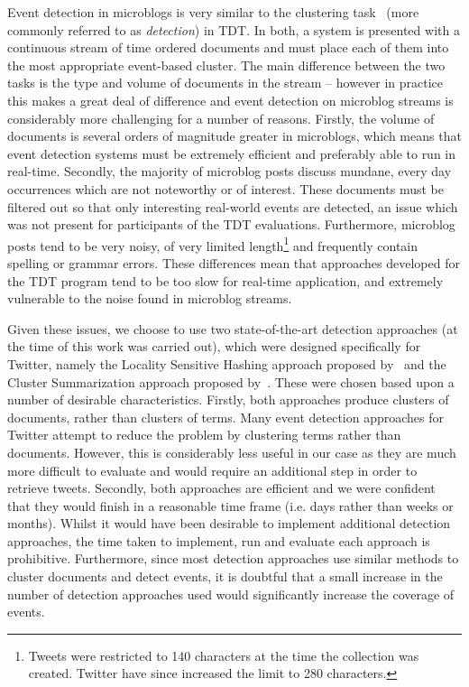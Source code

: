 Event detection in microblogs is very similar to the clustering task~\citep{allan2002topic} (more commonly referred to as \emph{detection}) in TDT.
In both, a system is presented with a continuous stream of time ordered documents and must place each of them into the most appropriate event-based cluster.
The main difference between the two tasks is the type and volume of documents in the stream -- however in practice this makes a great deal of difference and event detection on microblog streams is considerably more challenging for a number of reasons.
Firstly, the volume of documents is several orders of magnitude greater in microblogs, which means that event detection systems must be extremely efficient and preferably able to run in real-time.
Secondly, the majority of microblog posts discuss mundane, every day occurrences which are not noteworthy or of interest.
These documents must be filtered out so that only interesting real-world events are detected, an issue which was not present for participants of the TDT evaluations.
Furthermore, microblog posts tend to be very noisy, of very limited length\footnote{Tweets were restricted to 140 characters at the time the collection was created. Twitter have since increased the limit to 280 characters.} and frequently contain spelling or grammar errors.
These differences mean that approaches developed for the TDT program tend to be too slow for real-time application, and extremely vulnerable to the noise found in microblog streams.

Given these issues, we choose to use two state-of-the-art detection approaches (at the time of this work was carried out), which were designed specifically for Twitter, namely the Locality Sensitive Hashing approach proposed by~\cite{Petrovic:2010:SFS:1857999.1858020} and the Cluster Summarization approach proposed by~\cite{aggarwalevent}.
These were chosen based upon a number of desirable characteristics. Firstly, both approaches produce clusters of documents, rather than clusters of terms.
Many event detection approaches for Twitter attempt to reduce the problem by clustering terms rather than documents.
However, this is considerably less useful in our case as they are much more difficult to evaluate and would require an additional step in order to retrieve tweets.
Secondly, both approaches are efficient and we were confident that they would finish in a reasonable time frame (i.e. days rather than weeks or months).
Whilst it would have been desirable to implement additional detection approaches, the time taken to implement, run and evaluate each approach is prohibitive.
Furthermore, since most detection approaches use similar methods to cluster documents and detect events, it is doubtful that a small increase in the number of detection approaches used would significantly increase the coverage of events.

